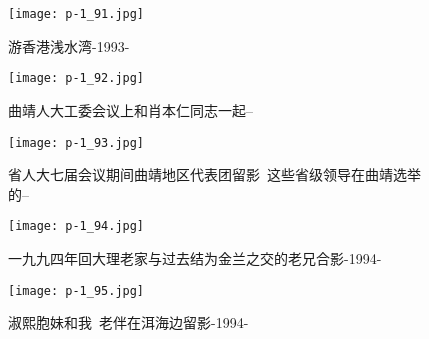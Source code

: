 \clearpage


\begin{figure}
    \begin{center}
        \texttt{[image: p-1\_91.jpg]}
        \begin{shaded}
            \caption{游香港浅水湾-1993-}
        \end{shaded}
    \end{center}
\end{figure}

\clearpage


\begin{figure}
    \begin{center}
        \texttt{[image: p-1\_92.jpg]}
        \begin{shaded}
            \caption{曲靖人大工委会议上和肖本仁同志一起--}
        \end{shaded}
    \end{center}
\end{figure}

\clearpage


\begin{figure}
    \begin{center}
        \texttt{[image: p-1\_93.jpg]}
        \begin{shaded}
            \caption{省人大七届会议期间曲靖地区代表团留影~这些省级领导在曲靖选举的--}
        \end{shaded}
    \end{center}
\end{figure}

\clearpage


\begin{figure}
    \begin{center}
        \texttt{[image: p-1\_94.jpg]}
        \begin{shaded}
            \caption{一九九四年回大理老家与过去结为金兰之交的老兄合影-1994-}
        \end{shaded}
    \end{center}
\end{figure}

\clearpage


\begin{figure}
    \begin{center}
        \texttt{[image: p-1\_95.jpg]}
        \begin{shaded}
            \caption{淑熙胞妹和我~老伴在洱海边留影-1994-}
        \end{shaded}
    \end{center}
\end{figure}

